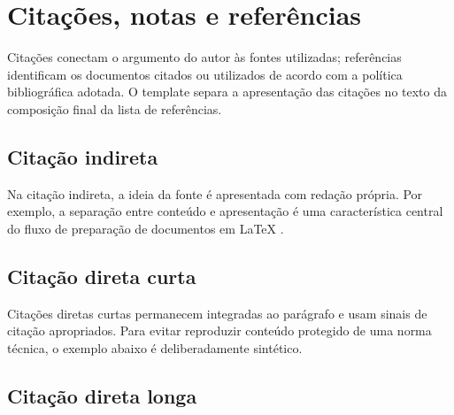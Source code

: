 \section{Citações, notas e referências}\label{sec:citacoes-referencias}

Citações conectam o argumento do autor às fontes utilizadas; referências identificam os documentos citados ou utilizados de acordo com a política bibliográfica adotada. O template separa a apresentação das citações no texto da composição final da lista de referências.

\subsection{Citação indireta}

Na citação indireta, a ideia da fonte é apresentada com redação própria. Por exemplo, a separação entre conteúdo e apresentação é uma característica central do fluxo de preparação de documentos em \LaTeX{} \parencite{lamport1994}.


\subsection{Citação direta curta}

Citações diretas curtas permanecem integradas ao parágrafo e usam sinais de citação apropriados. Para evitar reproduzir conteúdo protegido de uma norma técnica, o exemplo abaixo é deliberadamente sintético.


\subsection{Citação direta longa}


